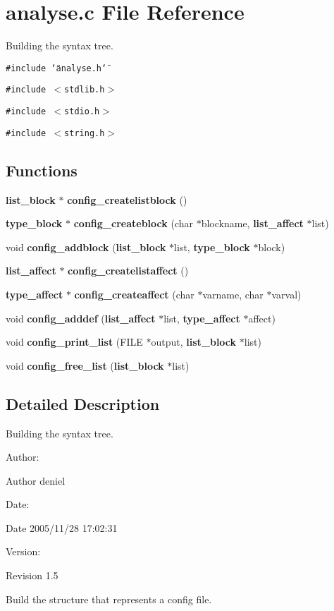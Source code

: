 \section{analyse.c File Reference}
\label{analyse_8c}
Building the syntax tree. 

{\tt \#include \char`\"{}analyse.h\char`\"{}}\par
{\tt \#include $<$stdlib.h$>$}\par
{\tt \#include $<$stdio.h$>$}\par
{\tt \#include $<$string.h$>$}\par
\subsection*{Functions}
\begin{CompactItemize}
\item 
{\bf list\_\-block} $\ast$ {\bf config\_\-createlistblock} ()
\item 
{\bf type\_\-block} $\ast$ {\bf config\_\-createblock} (char $\ast$blockname, {\bf list\_\-affect} $\ast$list)
\item 
void {\bf config\_\-addblock} ({\bf list\_\-block} $\ast$list, {\bf type\_\-block} $\ast$block)
\item 
{\bf list\_\-affect} $\ast$ {\bf config\_\-createlistaffect} ()
\item 
{\bf type\_\-affect} $\ast$ {\bf config\_\-createaffect} (char $\ast$varname, char $\ast$varval)
\item 
void {\bf config\_\-adddef} ({\bf list\_\-affect} $\ast$list, {\bf type\_\-affect} $\ast$affect)
\item 
void {\bf config\_\-print\_\-list} (FILE $\ast$output, {\bf list\_\-block} $\ast$list)
\item 
void {\bf config\_\-free\_\-list} ({\bf list\_\-block} $\ast$list)
\end{CompactItemize}


\subsection{Detailed Description}
Building the syntax tree. 

\begin{Desc}
\item[Author:]\begin{Desc}
\item[Author]deniel \end{Desc}
\end{Desc}
\begin{Desc}
\item[Date:]\begin{Desc}
\item[Date]2005/11/28 17:02:31 \end{Desc}
\end{Desc}
\begin{Desc}
\item[Version:]\begin{Desc}
\item[Revision]1.5 \end{Desc}
\end{Desc}
Build the structure that represents a config file.


